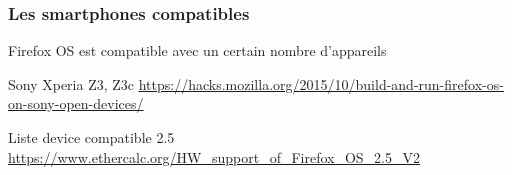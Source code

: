 \documentclass{beamer}
\begin{document}
\begin{frame}
\frametitle{Les smartphones compatibles}
\begin{block}{Firefox OS est compatible avec un certain nombre d'appareils}
\end{block} 
\begin{block}{Sony Xperia Z3, Z3c }
\url{https://hacks.mozilla.org/2015/10/build-and-run-firefox-os-on-sony-open-devices/}\end{block} 
\begin{block}{Liste device compatible 2.5} 
\url{https://www.ethercalc.org/HW_support_of_Firefox_OS_2.5_V2}
\end{block} 
\end{frame}
\end{document}
